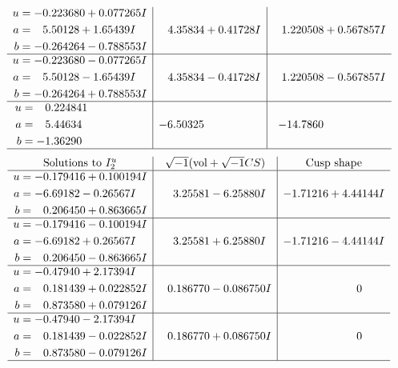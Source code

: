 \documentclass[1p]{elsarticle_modified}
\theoremstyle{definition}
\newcommand{\I}{\sqrt{-1}}
\begin{document}
$$\begin{array}{c|c|c}
\begin{aligned}
u &= -0.223680 + 0.077265 I \\
a &= \phantom{-}5.50128 + 1.65439 I \\
b &= -0.264264 - 0.788553 I\end{aligned}
 & \phantom{-}4.35834 + 0.41728 I & \phantom{-}1.220508 + 0.567857 I \\ \hline\begin{aligned}
u &= -0.223680 - 0.077265 I \\
a &= \phantom{-}5.50128 - 1.65439 I \\
b &= -0.264264 + 0.788553 I\end{aligned}
 & \phantom{-}4.35834 - 0.41728 I & \phantom{-}1.220508 - 0.567857 I \\ \hline\begin{aligned}
u &= \phantom{-}0.224841\phantom{ +0.000000I} \\
a &= \phantom{-}5.44634\phantom{ +0.000000I} \\
b &= -1.36290\phantom{ +0.000000I}\end{aligned}
 & -6.50325\phantom{ +0.000000I} & -14.7860\phantom{ +0.000000I}\\
 \hline 
 \end{array}$$\newpage$$\begin{array}{c|c|c}  
\text{Solutions to }I^u_{2}& \I (\text{vol} + \sqrt{-1}CS) & \text{Cusp shape}\\
 \hline 
\begin{aligned}
u &= -0.179416 + 0.100194 I \\
a &= -6.69182 - 0.26567 I \\
b &= \phantom{-}0.206450 + 0.863665 I\end{aligned}
 & \phantom{-}3.25581 - 6.25880 I & -1.71216 + 4.44144 I \\ \hline\begin{aligned}
u &= -0.179416 - 0.100194 I \\
a &= -6.69182 + 0.26567 I \\
b &= \phantom{-}0.206450 - 0.863665 I\end{aligned}
 & \phantom{-}3.25581 + 6.25880 I & -1.71216 - 4.44144 I \\ \hline\begin{aligned}
u &= -0.47940 + 2.17394 I \\
a &= \phantom{-}0.181439 + 0.022852 I \\
b &= \phantom{-}0.873580 + 0.079126 I\end{aligned}
 & \phantom{-}0.186770 - 0.086750 I & \phantom{-0.000000 } 0 \\ \hline\begin{aligned}
u &= -0.47940 - 2.17394 I \\
a &= \phantom{-}0.181439 - 0.022852 I \\
b &= \phantom{-}0.873580 - 0.079126 I\end{aligned}
 & \phantom{-}0.186770 + 0.086750 I & \phantom{-0.000000 } 0\\
 \hline 
 \end{array}$$\newpage\newpage\renewcommand{\arraystretch}{1}
\end{document}
